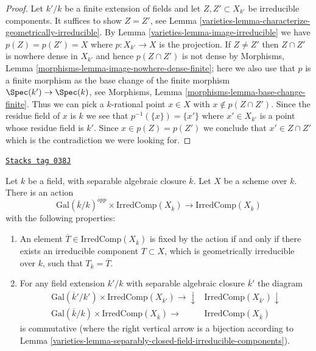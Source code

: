 \begin{proof}

Let $k'/k$ be a finite extension of fields and let $Z, Z' \subset X_{k'}$
be irreducible components. It suffices to show $Z = Z'$, see
Lemma \ref{varieties-lemma-characterize-geometrically-irreducible}.
By Lemma \ref{varieties-lemma-image-irreducible} we have $p(Z) = p(Z') = X$
where $p : X_{k'} \to X$ is the projection. If $Z \not = Z'$
then $Z \cap Z'$ is nowhere dense in $X_{k'}$ and hence $p(Z \cap Z')$
is not dense by
Morphisms, Lemma \ref{morphisms-lemma-image-nowhere-dense-finite};
here we also use that $p$ is a finite morphism as the base change
of the finite morphism $\Spec(k') \to \Spec(k)$, see
Morphisms, Lemma \ref{morphisms-lemma-base-change-finite}.
Thus we can pick a $k$-rational point $x \in X$ with
$x \not \in p(Z \cap Z')$. Since the residue field of $x$ is $k$
we see that $p^{-1}(\{x\}) = \{x'\}$ where $x' \in X_{k'}$
is a point whose residue field is $k'$. Since $x \in p(Z) = p(Z')$
we conclude that $x' \in Z \cap Z'$ which is the contradiction
we were looking for.
\end{proof}

\begin{lemma}
\label{varieties-lemma-galois-action-irreducible-components}
\href{https://stacks.math.columbia.edu/tag/038J}{\texttt{Stacks tag 038J}}

Let $k$ be a field, with separable algebraic closure $\overline{k}$.
Let $X$ be a scheme over $k$.
There is an action
$$
\text{Gal}(\overline{k}/k)^{opp} \times \text{IrredComp}(X_{\overline{k}})
\longrightarrow
\text{IrredComp}(X_{\overline{k}})
$$
with the following properties:
\begin{enumerate}
\item An element $\overline{T} \in \text{IrredComp}(X_{\overline{k}})$
is fixed by the action if and only if there exists an irreducible
component $T \subset X$, which is geometrically irreducible over $k$,
such that $T_{\overline{k}} = \overline{T}$.
\item For any field extension $k'/k$ with separable
algebraic closure $\overline{k}'$ the diagram
$$
\begin{array}{cc}\text{Gal}(\overline{k}'/k') \times \text{IrredComp}(X_{\overline{k}'})
\longrightarrow\downarrow & \text{IrredComp}(X_{\overline{k}'}) \downarrow \\ \text{Gal}(\overline{k}/k) \times \text{IrredComp}(X_{\overline{k}})
\longrightarrow & \text{IrredComp}(X_{\overline{k}})\end{array}
$$
is commutative (where the right vertical arrow is a bijection
according to Lemma \ref{varieties-lemma-separably-closed-field-irreducible-components}).
\end{enumerate}
\end{lemma}

